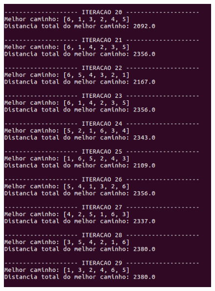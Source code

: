 \documentclass[hidelinks,12pt]{article}
\begin{document}
		\begin{figure}[!h]
			\centering
			\includegraphics[scale=0.6]{Figures/m6-2-3.png}
		\end{figure}

		\newpage
\end{document}
